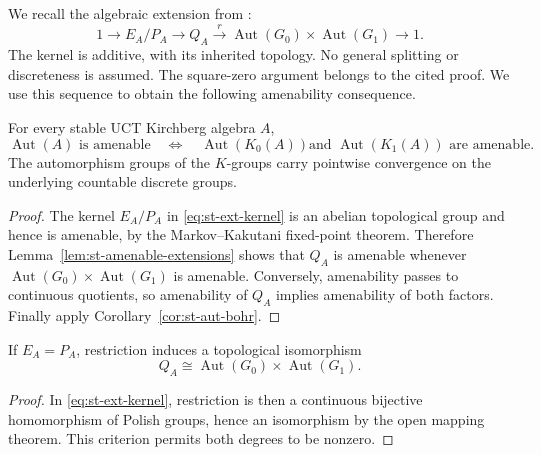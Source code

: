We recall the algebraic extension from
\cite[Section~8.1]{LupiniCuntz2026}:
\begin{equation}\label{eq:st-ext-kernel}
 1\longrightarrow E_A/P_A\longrightarrow Q_A
 \xrightarrow{r}\operatorname{Aut}(G_0)\times\operatorname{Aut}(G_1)\longrightarrow1.
\end{equation}
The kernel is additive, with its inherited topology. No general
splitting or discreteness is assumed. The square-zero argument belongs
to the cited proof. We use this sequence to obtain the following
amenability consequence.

\begin{corollary}\label{cor:st-amenability-k-groups}
 For every stable UCT Kirchberg algebra $A$, 
\begin{equation*}
\operatorname{Aut}(A)\text{ is amenable}  \quad\Longleftrightarrow\quad  \operatorname{Aut}(K_0(A))\text{
and }\operatorname{Aut}(K_1(A))\text{ are amenable}. 
\end{equation*}
The automorphism groups of the $K$-groups carry pointwise convergence on the
underlying countable discrete groups.
\end{corollary}

\begin{proof}
The kernel $E_A/P_A$ in \eqref{eq:st-ext-kernel} is an abelian topological
group and hence is amenable, by the Markov--Kakutani fixed-point theorem.
Therefore Lemma~\ref{lem:st-amenable-extensions} shows that $Q_A$ is amenable
whenever $\operatorname{Aut}(G_0)\times\operatorname{Aut}(G_1)$ is amenable. Conversely, amenability
passes to continuous quotients, so amenability of $Q_A$ implies amenability
of both factors. Finally apply Corollary~\ref{cor:st-aut-bohr}.
\end{proof}

\begin{corollary}\label{cor:st-vanishing-ext}
If \(E_A=P_A\), restriction induces a topological isomorphism
\[
 Q_A\cong\operatorname{Aut}(G_0)\times\operatorname{Aut}(G_1).
\]
\end{corollary}
\begin{proof}
In \eqref{eq:st-ext-kernel}, restriction is then a continuous bijective
homomorphism of Polish groups, hence an isomorphism by the open mapping
theorem. This criterion permits both degrees to be nonzero.
\end{proof}

